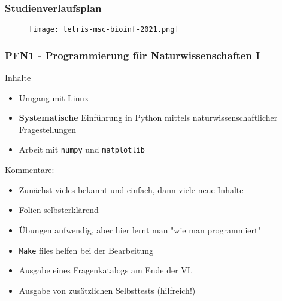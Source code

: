 \begin{frame}
     \frametitle{Studienverlaufsplan}
  \logos 
  \begin{figure}
      \centering
      \texttt{[image: tetris-msc-bioinf-2021.png]}
  \end{figure}
\end{frame}

\begin{frame}
     \frametitle{PFN1 - Programmierung für Naturwissenschaften I}
  \logos 
    \begin{alertblock}{Inhalte}
  \small
      \begin{itemize}
          \item Umgang mit Linux
          \item \textbf{Systematische} Einführung in Python mittels naturwissenschaftlicher Fragestellungen
          \item Arbeit mit \texttt{numpy} und \texttt{matplotlib}
      \end{itemize}
 
  \end{alertblock}

\pause
Kommentare:
\begin{itemize}
    \item Zunächst vieles bekannt und einfach, dann viele neue Inhalte
    \item Folien selbsterklärend
    \item Übungen aufwendig, aber hier lernt man "wie man programmiert"
    \item \texttt{Make} files helfen bei der Bearbeitung
    \item Ausgabe eines Fragenkatalogs am Ende der VL
    \item Ausgabe von zusätzlichen Selbsttests (hilfreich!)
\end{itemize}
\end{frame}
